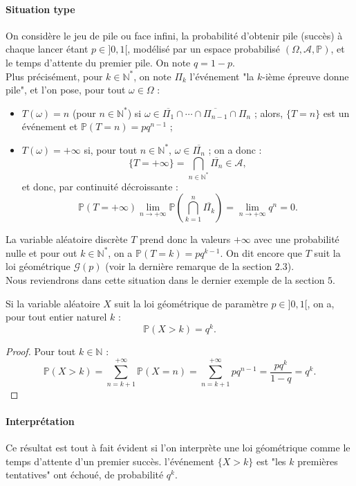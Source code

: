 \documentclass[french]{article}
\renewcommand{\P}{\mathbb{P}}
\newcommand{\N}{\mathbb{N}}
\newcommand{\st}{^*}
\theoremstyle{plain}
\theoremstyle{definition}
\theoremstyle{remark}
\begin{document}
\paragraph{Situation type}
On considère le jeu de pile ou face infini, la probabilité d'obtenir pile (succès) à chaque lancer étant $p\in]0,1[$, modélisé par un espace probabilisé $(\Omega,\mathcal{A},\P)$, et le temps d'attente du premier pile. On note $q=1-p$. \\
Plus précisément, pour $k\in\N\st$, on note $\Pi_k$ l'événement "la $k$-ième épreuve donne pile", et l'on pose, pour tout $\omega\in\Omega$ :
\begin{itemize}
	\item $T(\omega)=n$ (pour $n\in\N\st$) si $\omega\in\overline{\Pi_1}\cap\cdots\cap\overline{\Pi_{n-1}}\cap\Pi_n$ ; alors, $\{T=n\}$ est un événement et $\P(T=n)=pq^{n-1}$ ;
	\item $T(\omega)=+\infty$ si, pour tout $n\in\N\st$, $\omega\in\overline{\Pi_n}$ ; on a donc :
	$$\{T=+\infty\}=\bigcap_{n\in\N\st}\overline{\Pi_n}\in\mathcal{A},$$ et donc, par continuité décroissante :
	$$\P(T=+\infty)\underset{n\to+\infty}{\lim}\P\left(\bigcap_{k=1}^n\overline{\Pi_k}\right)=\underset{n\to+\infty}{\lim}q^n=0.$$
\end{itemize}
La variable aléatoire discrète $T$ prend donc la valeurs $+\infty$ avec une probabilité nulle et pour out $k\in\N\st$, on a $\P(T=k)=pq^{k-1}$. On dit encore que $T$ suit la loi géométrique $\mathcal{G}(p)$ (voir la dernière remarque de la section $2.3$).\\
Nous reviendrons dans cette situation dans le dernier exemple de la section $5$.

\begin{prop}%
	Si la variable aléatoire $X$ suit la loi géométrique de paramètre $p\in]0,1[$, on a, pour tout entier naturel $k$ : 
	$$\P(X>k)=q^k.$$
\end{prop}
\begin{proof}
	Pour tout $k\in\N$ :
	$$\P(X>k)=\sum_{n=k+1}^{+\infty}\P(X=n)=\sum_{n=k+1}^{+\infty}pq^{n-1}=\frac{pq^k}{1-q}=q^k.$$
\end{proof}

\paragraph{Interprétation} Ce résultat est tout à fait évident si l'on interprète une loi géométrique comme le temps d'attente d'un premier succès. l'événement $\{X>k\}$ est "les $k$ premières tentatives" ont échoué, de probabilité $q^k$.
\end{document}

